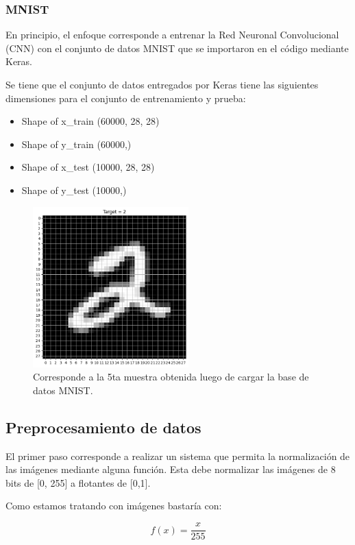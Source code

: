 \documentclass[journal]{IEEEtai}
\begin{document}
\subsubsection{\textbf{MNIST}}

En principio, el enfoque corresponde a entrenar la Red Neuronal Convolucional (CNN) con el conjunto de datos MNIST que se importaron en el código mediante Keras.

Se tiene que el conjunto de datos entregados por Keras tiene las siguientes dimensiones para el conjunto de entrenamiento y prueba:

\begin{itemize}
\item	Shape of x\_train (60000, 28, 28)
\item	Shape of y\_train (60000,)
\item	Shape of x\_test (10000, 28, 28)
\item	Shape of y\_test (10000,)
\end{itemize}

\begin{figure}[h!]
\centering
\includegraphics[width=6cm]{img/mnist1.png}
\caption{Corresponde a la 5ta muestra obtenida luego de cargar la base de datos MNIST.}
\label{fig: mnist1}
\end{figure}

\subsection{Preprocesamiento de datos}

El primer paso corresponde a realizar un sistema que permita la normalización de las imágenes mediante alguna función. Esta debe normalizar las imágenes de 8 bits de [0, 255] a flotantes de [0,1].

Como estamos tratando con imágenes bastaría con:

\begin{equation}
f(x) = \frac{x}{255}
\end{equation}
\end{document}
